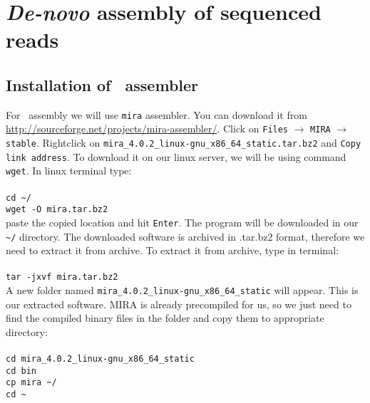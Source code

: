 \section{\textit{De-novo} assembly of sequenced reads}
\subsection{Installation of \denovo~assembler}
For \denovo~assembly we will use \texttt{mira} assembler.
You can download it from \url{http://sourceforge.net/projects/mira-assembler/}.
Click on \texttt{Files} $\rightarrow$ \texttt{MIRA} $\rightarrow$ \texttt{stable}. Rightclick on \texttt{mira\_4.0.2\_linux-gnu\_x86\_64\_static.tar.bz2}
and \texttt{Copy link address}.
To download it on our linux server, we will be using command \texttt{wget}. In linux terminal type: \\~\\
\texttt{cd \textasciitilde/\progDir} \\
\texttt{wget -O mira.tar.bz2} \\

paste the copied location and hit \texttt{Enter}.
The program will be downloaded in our \texttt{\textasciitilde/\progDir} directory. 
The downloaded software is archived in .tar.bz2 format, therefore we need to extract it from archive.
To extract it from archive, type in terminal:\\~\\
\texttt{tar -jxvf mira.tar.bz2}\\

A new folder named \texttt{mira\_4.0.2\_linux-gnu\_x86\_64\_static} will appear.
This is our extracted software.
MIRA is already precompiled for us, so we just need
to find the compiled binary files in the folder and copy them to appropriate directory: \\~\\
\texttt{cd mira\_4.0.2\_linux-gnu\_x86\_64\_static} \\
\texttt{cd bin} \\
\texttt{cp mira \textasciitilde/\binDir} \\
\texttt{cd \textasciitilde} \\

